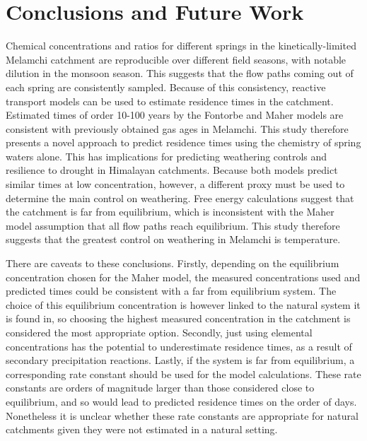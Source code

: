 \newpage

\section{Conclusions and Future Work}

Chemical concentrations and ratios for different springs in the kinetically-limited Melamchi catchment are reproducible over different field seasons, with notable dilution in the monsoon season. This suggests that the flow paths coming out of each spring are consistently sampled. Because of this consistency, reactive transport models can be used to estimate residence times in the catchment. Estimated times of order 10-100 years by the Fontorbe and Maher models are consistent with previously obtained gas ages in Melamchi. This study therefore presents a novel approach to predict residence times using the chemistry of spring waters alone. This has implications for predicting weathering controls and resilience to drought in Himalayan catchments. Because both models predict similar times at low concentration, however, a different proxy must be used to determine the main control on weathering. Free energy calculations suggest that the catchment is far from equilibrium, which is inconsistent with the Maher model assumption that all flow paths reach equilibrium. This study therefore suggests that the greatest control on weathering in Melamchi is temperature.

\bsk

There are caveats to these conclusions. Firstly, depending on the equilibrium concentration chosen for the Maher model, the measured concentrations used and predicted times could be consistent with a far from equilibrium system. The choice of this equilibrium concentration is however linked to the natural system it is found in, so choosing the highest measured concentration in the catchment is considered the most appropriate option. Secondly, just using elemental concentrations has the potential to underestimate residence times, as a result of secondary precipitation reactions. Lastly, if the system is far from equilibrium, a corresponding rate constant should be used for the model calculations. These rate constants are orders of magnitude larger than those considered close to equilibrium, and so would lead to predicted residence times on the order of days. Nonetheless it is unclear whether these rate constants are appropriate for natural catchments given they were not estimated in a natural setting.

